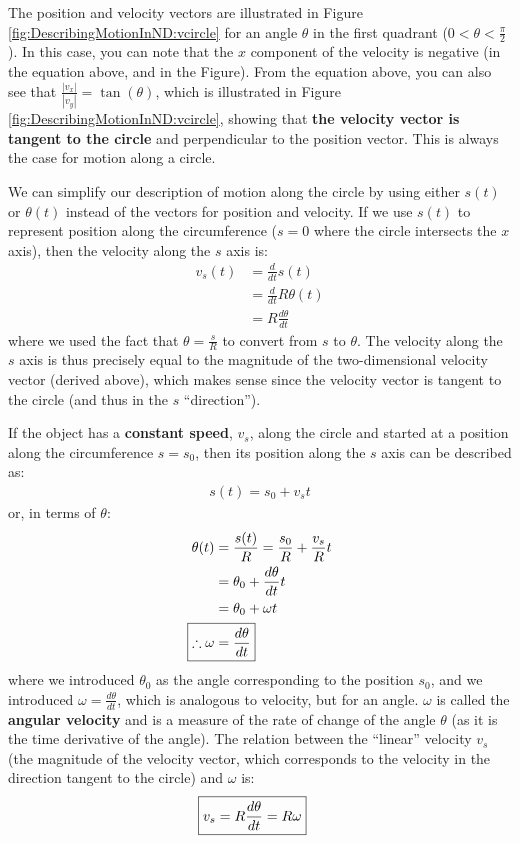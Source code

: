 The position and velocity vectors are illustrated in Figure \ref{fig:DescribingMotionInND:vcircle} for an angle $\theta$ in the first quadrant ($0<\theta<\frac{\pi}{2}$). In this case, you can note that the $x$ component of the velocity is negative (in the equation above, and in the Figure). From the equation above, you can also see that $\frac{|v_x|}{|v_y|}=\tan(\theta)$, which is illustrated in Figure \ref{fig:DescribingMotionInND:vcircle}, showing that \textbf{the velocity vector is tangent to the circle} and perpendicular to the position vector. This is always the case for motion along a circle.

We can simplify our description of motion along the circle by using either $s(t)$ or $\theta(t)$ instead of the vectors for position and velocity. If we use $s(t)$ to represent position along the circumference ($s=0$ where the circle intersects the $x$ axis), then the velocity along the $s$ axis is:
\begin{align*}
v_s(t)&=\frac{d}{dt}s(t)\\
&=\frac{d}{dt}R\theta(t)\\
&=R\frac{d\theta}{dt}
\end{align*}
where we used the fact that $\theta=\frac{s}{R}$ to convert from $s$ to $\theta$. The velocity along the $s$ axis is thus precisely equal to the magnitude of the two-dimensional velocity vector (derived above), which makes sense since the velocity vector is tangent to the circle (and thus in the $s$ ``direction'').

If the object has a \textbf{constant speed}, $v_s$, along the circle and started at a position along the circumference $s=s_0$, then its position along the $s$ axis can be described as:
\begin{align*}
s(t)=s_0+v_st
\end{align*}
or, in terms of $\theta$:
\begin{align*}
\theta(t)&=\frac{s(t)}{R}=\frac{s_0}{R}+\frac{v_s}{R}t\\
&=\theta_0 + \frac{d\theta}{dt}t\\
&=\theta_0 + \omega t\\
\Aboxed{\therefore \omega &= \frac{d\theta}{dt}}
\end{align*}
where we introduced $\theta_0$ as the angle corresponding to the position $s_0$, and we introduced $\omega=\frac{d\theta}{dt}$, which is analogous to velocity, but for an angle. $\omega$ is called the \textbf{angular velocity} and is a measure of the rate of change of the angle $\theta$ (as it is the time derivative of the angle). The relation between the ``linear'' velocity $v_s$ (the magnitude of the velocity vector, which corresponds to the velocity in the direction tangent to the circle) and $\omega$ is:
\begin{align*}
\Aboxed{v_s=R\frac{d\theta}{dt}=R\omega }
\end{align*}

